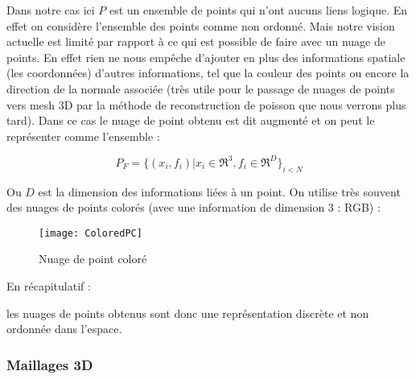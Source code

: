 Dans notre cas ici $P$ est un ensemble de points qui n'ont aucuns liens logique. En effet on considère l'ensemble des points comme non ordonné.
Mais notre vision actuelle est limité par rapport à ce qui est possible de faire avec un nuage de points. En effet rien ne nous empêche d'ajouter en plus des informations spatiale (les coordonnées) d'autres informations, tel que la couleur des points ou encore la direction de la normale associée (très utile pour le passage de nuages de points vers mesh 3D par la méthode de reconstruction de poisson que nous verrons plus tard). Dans ce cas le nuage de point obtenu est dit augmenté et on peut le représenter comme l'ensemble :

\[ P_{F} = \{ (x_{i}, f_{i}) | x_{i} \in \Re^{3}, f_{i} \in \Re^{D} \}_{i<N} \]

Ou $D$ est la dimension des informations liées à un point.
On utilise très souvent des nuages de points colorés (avec une information de dimension 3 : RGB) :

\begin{figure}[h]
    \centering
    \texttt{[image: ColoredPC]}
    \caption{Nuage de point coloré}
    \label{fig:pointCloud2}
\end{figure}


En récapitulatif :

\begin{figure}[h]
    \hfill
    \hfill
    \caption{}
    \label{fig:figure1}
\end{figure}

les nuages de points obtenus sont donc une représentation discrète et non ordonnée dans l'espace.

\FloatBarrier
\subsubsection{Maillages 3D}
